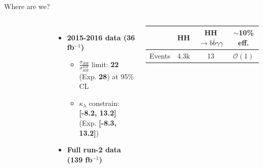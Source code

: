 \begin{frame}{Where are we?}
\begin{columns}

\begin{figure}
    \centering
\end{figure}

\begin{itemize}
    \item \textbf{\textcolor{applegreen}{2015-2016 data (36 fb$^{-1}$)}}
    \begin{itemize}
        \item $\frac{\sigma_{HH}}{\sigma_{HH}^{SM}}$ limit: \textbf{\textcolor{structurColor}{22}} (Exp. \textbf{28}) at 95\% CL
        \item $\kappa_{\lambda}$ constrain: \textbf{\textcolor{structurColor}{[-8.2, 13.2]}} (Exp. \textbf{[-8.3, 13.2]})
    \end{itemize}
\pause    
    \item \textbf{\textcolor{HHred}{Full run-2 data (139 fb$^{-1}$)}}
\end{itemize}    
\begin{tabular}{lccc}
    \hline 
    \hline
     & HH & HH$\to b\bar{b}\gamma\gamma$ & $\sim$10\% eff. \\
     \hline
    Events  & 4.3k & 13 & $\mathcal{O}(1)$ \\
      \hline\hline 
\end{tabular}    
\end{columns}
\end{frame}